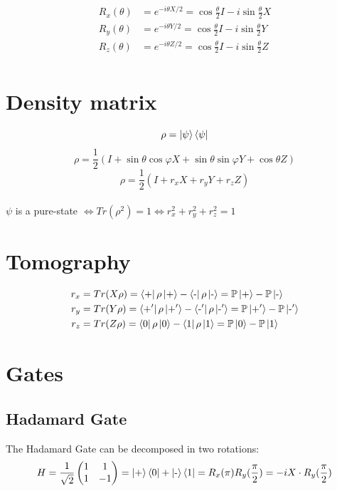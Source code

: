 \documentclass[a4paper,10pt]{scrartcl}
\begin{document}
\begin{equation*}
\begin{split}
R_x(\theta) &= e^{-i\theta X /2} = \cos{\frac{\theta}{2}}I - i\sin{\frac{\theta}{2}}X \\
R_y(\theta) &= e^{-i\theta Y /2} = \cos{\frac{\theta}{2}}I - i\sin{\frac{\theta}{2}}Y \\
R_z(\theta) &= e^{-i\theta Z /2} = \cos{\frac{\theta}{2}}I - i\sin{\frac{\theta}{2}}Z \\
\end{split}
\end{equation*}

\section*{Density matrix}
\[\rho = \ket{\psi}\bra{\psi}\]
\[\rho = \frac{1}{2}(I + \sin \theta \cos \varphi X + \sin \theta \sin \varphi Y + \cos \theta Z)\]
\[\rho = \frac{1}{2}(I + r_x X +  r_y Y + r_z Z)\]
\\
$\psi$ is a pure-state $\Leftrightarrow Tr(\rho ^ 2) = 1 \Leftrightarrow r_x^2+ r_y^2 + r_z^2 = 1$

\section*{Tomography}

\begin{equation*}
\begin{split}
r_x &= Tr(X\rho) = \bra{\text{+}}{\rho} \ket{\text{+}} - \bra{\text{-}}{\rho} \ket{\text{-}} = \mathbb{P}\ket{\text{+}}-\mathbb{P}\ket{\text{-}}\\
r_y &= Tr(Y\rho) = \bra{\text{+}'}{\rho} \ket{\text{+}'} - \bra{\text{-}'}{\rho} \ket{\text{-}'} = \mathbb{P}\ket{\text{+}'}-\mathbb{P}\ket{\text{-}'}\\
r_z &= Tr(Z\rho) = \bra{0}{\rho} \ket{0} - \bra{1}{\rho} \ket{1} = \mathbb{P}\ket{0}-\mathbb{P}\ket{1}
\end{split}
\end{equation*}

\section*{Gates}
\subsection*{Hadamard Gate}
The Hadamard Gate can be decomposed in two rotations:
\[H = 
\frac{1}{\sqrt{2}}\begin{pmatrix}
1 & 1\\ 
1 & -1
\end{pmatrix}
= \ket{\text{+}}\bra{0} + \ket{\text{-}}\bra{1}
= R_x(\pi)R_y(\frac{\pi}{2}) = -iX \cdot R_y(\frac{\pi}{2}) 
\]
\end{document}
